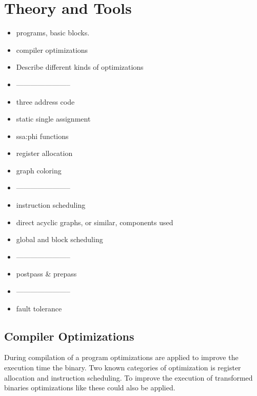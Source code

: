 \chapter{Theory and Tools}

\begin{itemize}
    \item programs, basic blocks.
    \item compiler optimizations
    \item Describe different kinds of optimizations
    \item -----------------------
    \item three address code
    \item static single assignment
    \item ssa:phi functions
    \item register allocation
    \item graph coloring 
    \item -----------------------
    \item instruction scheduling
    \item direct acyclic graphs, or similar, components used
    \item global and block scheduling
    \item -----------------------
    \item postpass \& prepass
    \item -----------------------
    
    \item fault tolerance

\end{itemize}



\section{Compiler Optimizations}
During compilation of a program optimizations are applied
to improve the execution time the binary. Two known categories
of optimization is register allocation and instruction scheduling.
To improve the execution of transformed binaries optimizations
like these could also be applied.


